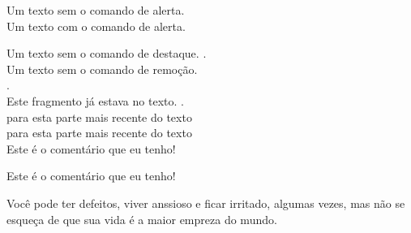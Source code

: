\documentclass[12pt,a4paper,brazil]{article}
\begin{document}
\newpage

\noindent Um texto sem o comando de alerta.\\
\alert{Um texto com o comando de alerta}.

Um texto sem o comando de destaque.
.\\

\noindent Um texto sem o comando de remoção.\\
.\\

\noindent Este fragmento já estava no texto. 
.\\

\noindent {} {para esta parte mais recente do texto}\\

\noindent {} {para esta parte mais recente do texto}\\


\setreviewson
{} {Este é o coment{\'a}rio que eu tenho!}


\setreviewsoff
{} {Este é o coment{\'a}rio que eu tenho!}


Você pode ter defeitos, viver \alert{anssioso} e ficar irritado, algumas vezes, mas não se esqueça de que sua vida é a maior \alert{empreza} do mundo.
\end{document}
